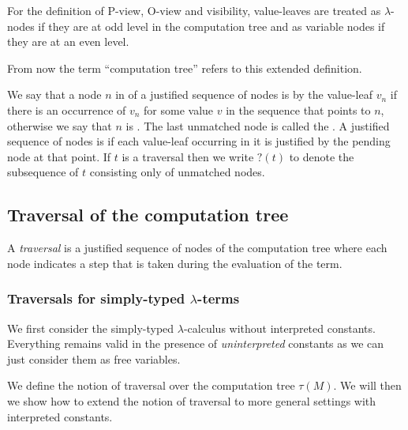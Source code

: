 For the definition
of P-view, O-view and visibility, value-leaves are treated as
$\lambda$-nodes if they are at odd level in the computation tree and
as variable nodes if they are at an even level.

From now the term ``computation tree'' refers to this extended
definition.
\smallskip

We say that a node $n$ in of a justified sequence of nodes is
 by the value-leaf $v_n$ if there is an occurrence of $v_n$ for some value $v$ in the
sequence that points to $n$, otherwise we say that $n$ is
. The last unmatched node is called the
.  A justified sequence of nodes is
 if each value-leaf occurring in it is justified by the pending node at that point.
If $t$ is a traversal then we write
$?(t)$ to denote the subsequence of $t$ consisting only of unmatched
nodes.

\subsection{Traversal of the computation tree}
\label{subsec:traversal}
A \emph{traversal} is a justified sequence of nodes of the computation tree where each node indicates a step that is taken during the evaluation of the term.

\subsubsection{Traversals for simply-typed $\lambda$-terms}

We first consider the simply-typed $\lambda$-calculus without interpreted constants.
Everything remains valid in the presence of \emph{uninterpreted} constants as we can just
consider them as free variables.

We define the notion of traversal over the computation tree $\tau(M)$.
We will then we show how to extend the notion of traversal to more general settings with interpreted constants.

